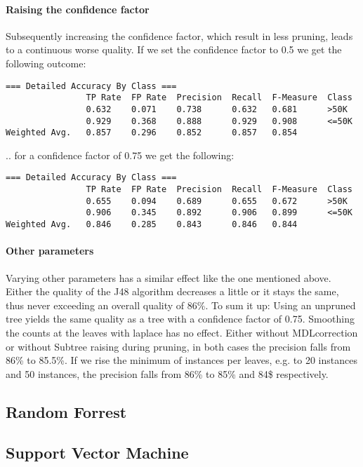 \documentclass[paper=a4, fontsize=11pt]{scrartcl} %
\numberwithin{equation}{section} %
\numberwithin{figure}{section} %
\numberwithin{table}{section} %
\begin{document}
\paragraph{Raising the confidence factor}
Subsequently increasing the confidence factor, which result in less pruning, leads to a continuous worse quality. If we set the confidence factor to 0.5 we get the following outcome:
\begin{lstlisting}
=== Detailed Accuracy By Class ===
                TP Rate  FP Rate  Precision  Recall  F-Measure  Class
                0.632    0.071    0.738      0.632   0.681      >50K
                0.929    0.368    0.888      0.929   0.908      <=50K
Weighted Avg.   0.857    0.296    0.852      0.857   0.854      
\end{lstlisting}
.. for a confidence factor of 0.75 we get the following:
\begin{lstlisting}
=== Detailed Accuracy By Class ===
                TP Rate  FP Rate  Precision  Recall  F-Measure  Class
                0.655    0.094    0.689      0.655   0.672      >50K
                0.906    0.345    0.892      0.906   0.899      <=50K
Weighted Avg.   0.846    0.285    0.843      0.846   0.844     
\end{lstlisting}

\paragraph{Other parameters}
Varying other parameters has a similar effect like the one mentioned above. Either the quality of the J48 algorithm decreases a little or it stays the same, thus never exceeding an overall quality of 86\%. To sum it up: Using an unpruned tree yields the same quality as a tree with a confidence factor of 0.75. Smoothing the counts at the leaves with laplace has no effect. Either without MDLcorrection or without Subtree raising during pruning, in both cases the precision falls from 86\% to 85.5\%. If we rise the minimum of instances per leaves, e.g. to 20 instances and 50 instances, the precision falls from 86\% to 85\% and 84\$ respectively.

\subsection{Random Forrest}




\subsection{Support Vector Machine}
\end{document}
